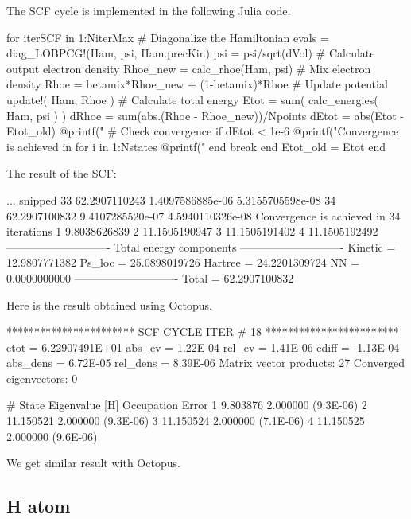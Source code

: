 The SCF cycle is implemented in the following Julia code.
\begin{juliacode}
for iterSCF in 1:NiterMax
  # Diagonalize the Hamiltonian
  evals = diag_LOBPCG!(Ham, psi, Ham.precKin)
  psi = psi/sqrt(dVol)
  # Calculate output electron density
  Rhoe_new = calc_rhoe(Ham, psi)
  # Mix electron density
  Rhoe = betamix*Rhoe_new + (1-betamix)*Rhoe
  # Update potential
  update!( Ham, Rhoe )
  # Calculate total energy
  Etot = sum( calc_energies( Ham, psi ) )
  dRhoe = sum(abs.(Rhoe - Rhoe_new))/Npoints
  dEtot = abs(Etot - Etot_old)
  @printf("%
  # Check convergence
  if dEtot < 1e-6
    @printf("Convergence is achieved in %
    for i in 1:Nstates
      @printf("%
    end
    break
  end
  Etot_old = Etot
end
\end{juliacode}

The result of the SCF:
\begin{textcode}
... snipped
  33      62.2907110243   1.4097586885e-06   5.3155705598e-08
  34      62.2907100832   9.4107285520e-07   4.5940110326e-08
Convergence is achieved in 34 iterations
 1       9.8038626839
 2      11.1505190947
 3      11.1505191402
 4      11.1505192492
----------------------------
Total energy components
----------------------------
Kinetic =      12.9807771382
Ps_loc  =      25.0898019726
Hartree =      24.2201309724
NN      =       0.0000000000
----------------------------
Total   =      62.2907100832
\end{textcode}

Here is the result obtained using Octopus.
\begin{textcode}
 *********************** SCF CYCLE ITER #   18 ************************
 etot  =  6.22907491E+01 abs_ev   =  1.22E-04 rel_ev   =  1.41E-06
 ediff =       -1.13E-04 abs_dens =  6.72E-05 rel_dens =  8.39E-06
Matrix vector products:     27
Converged eigenvectors:      0

#  State  Eigenvalue [H]  Occupation    Error
      1        9.803876    2.000000   (9.3E-06)
      2       11.150521    2.000000   (9.3E-06)
      3       11.150524    2.000000   (7.1E-06)
      4       11.150525    2.000000   (9.6E-06) 
\end{textcode}

We get similar result with Octopus.



\subsection{H atom}

